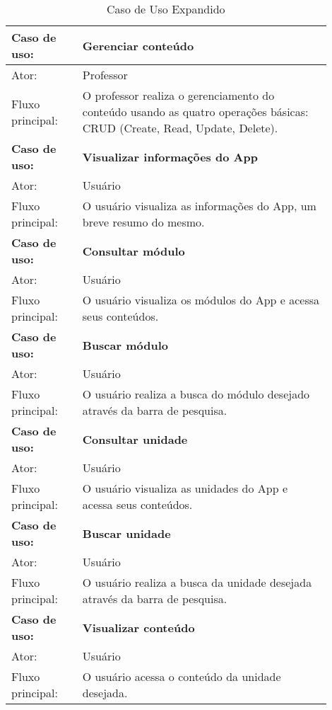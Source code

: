 \begin{table}[H]
\centering
\caption{Caso de Uso Expandido}
\label{tab:caso_de_uso_extendido}
\begin{tabular}{|C{0.2\linewidth}|p{0.7\linewidth}|}
\hline

\bfseries Caso de uso:    & \bfseries Gerenciar conteúdo \\ \hline
Ator: & Professor \\ \hline
Fluxo principal: & O professor realiza o gerenciamento do conteúdo usando as quatro operações básicas: CRUD (Create, Read, Update, Delete).   \\ \hline

\bfseries Caso de uso:    & \bfseries Visualizar informações do App \\ \hline
Ator: & Usuário \\ \hline
Fluxo principal: & O usuário visualiza as informações do App, um breve resumo do mesmo.   \\ \hline

\bfseries Caso de uso:    & \bfseries Consultar módulo \\ \hline
Ator: & Usuário \\ \hline
Fluxo principal: & O usuário visualiza os módulos do App e acessa seus conteúdos.   \\ \hline

\bfseries Caso de uso:    & \bfseries Buscar módulo \\ \hline
Ator: & Usuário \\ \hline
Fluxo principal: & O usuário realiza a busca do módulo desejado através da barra de pesquisa.   \\ \hline

\bfseries Caso de uso:    & \bfseries Consultar unidade \\ \hline
Ator: & Usuário \\ \hline
Fluxo principal: & O usuário visualiza as unidades do App e acessa seus conteúdos.   \\ \hline

\bfseries Caso de uso:    & \bfseries Buscar unidade \\ \hline
Ator: & Usuário \\ \hline
Fluxo principal: & O usuário realiza a busca da unidade desejada através da barra de pesquisa.   \\ \hline

\bfseries Caso de uso:    & \bfseries Visualizar conteúdo \\ \hline
Ator: & Usuário \\ \hline
Fluxo principal: & O usuário acessa o conteúdo da unidade desejada.   \\ \hline

\end{tabular}
{}
\end{table}